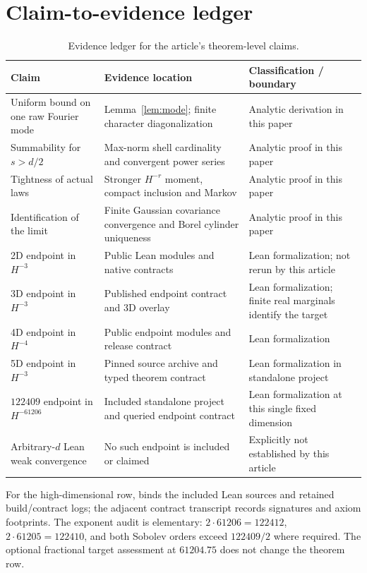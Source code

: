 \section{Claim-to-evidence ledger}\label{app:ledger}
\begin{table}[ht]
\centering\footnotesize
\caption{Evidence ledger for the article's theorem-level claims.}\label{tab:ledger}
\begin{tabular}{@{}p{}p{}p{}@{}}
\toprule
Claim & Evidence location & Classification / boundary\\
\midrule
Uniform bound on one raw Fourier mode & Lemma~\ref{lem:mode}; finite character diagonalization & Analytic derivation in this paper\\
Summability for $s>d/2$ & Max-norm shell cardinality and convergent power series & Analytic proof in this paper\\
Tightness of actual laws & Stronger $H^{-r}$ moment, compact inclusion and Markov & Analytic proof in this paper\\
Identification of the limit & Finite Gaussian covariance convergence and Borel cylinder uniqueness & Analytic proof in this paper\\
2D endpoint in $H^{-3}$ & Public Lean modules and native contracts & Lean formalization; not rerun by this article\\
3D endpoint in $H^{-3}$ & Published endpoint contract and 3D overlay & Lean formalization; finite real marginals identify the target\\
4D endpoint in $H^{-4}$ & Public endpoint modules and release contract & Lean formalization\\
5D endpoint in $H^{-3}$ & Pinned source archive and typed theorem contract & Lean formalization in standalone project\\
$122409$ endpoint in $H^{-61206}$ & Included standalone project and queried endpoint contract & Lean formalization at this single fixed dimension\\
Arbitrary-$d$ Lean weak convergence & No such endpoint is included or claimed & Explicitly not established by this article\\
\bottomrule
\end{tabular}
\end{table}

For the high-dimensional row,  binds the included Lean sources and retained build/contract logs; the adjacent contract transcript records signatures and axiom footprints. The exponent audit is elementary: $2\cdot61206=122412$, $2\cdot61205=122410$, and both Sobolev orders exceed $122409/2$ where required. The optional fractional target assessment at $61204.75$ does not change the theorem row.

